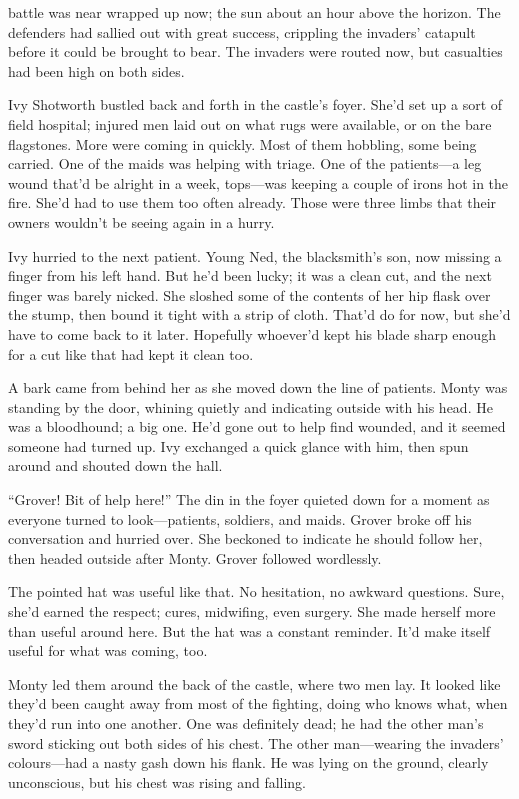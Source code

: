 \storychapter{}

 battle was near wrapped up now; the sun about an hour above the horizon.
The defenders had sallied out with great success, crippling the invaders' catapult before it could be brought to bear.
The invaders were routed now, but casualties had been high on both sides.

Ivy Shotworth bustled back and forth in the castle's foyer.
She'd set up a sort of field hospital; injured men laid out on what rugs were available, or on the bare flagstones.
More were coming in quickly.
Most of them hobbling, some being carried.
One of the maids was helping with triage.
One of the patients---a leg wound that'd be alright in a week, tops---was keeping a couple of irons hot in the fire.
She'd had to use them too often already.
Those were three limbs that their owners wouldn't be seeing again in a hurry.

Ivy hurried to the next patient.
Young Ned, the blacksmith's son, now missing a finger from his left hand.
But he'd been lucky; it was a clean cut, and the next finger was barely nicked.
She sloshed some of the contents of her hip flask over the stump, then bound it tight with a strip of cloth.
That'd do for now, but she'd have to come back to it later.
Hopefully whoever'd kept his blade sharp enough for a cut like that had kept it clean too.

A bark came from behind her as she moved down the line of patients.
Monty was standing by the door, whining quietly and indicating outside with his head.
He was a bloodhound; a big one.
He'd gone out to help find wounded, and it seemed someone had turned up.
Ivy exchanged a quick glance with him, then spun around and shouted down the hall.

``Grover!
Bit of help here!''
The din in the foyer quieted down for a moment as everyone turned to look---patients, soldiers, and maids.
Grover broke off his conversation and hurried over.
She beckoned to indicate he should follow her, then headed outside after Monty.
Grover followed wordlessly.

The pointed hat was useful like that.
No hesitation, no awkward questions.
Sure, she'd earned the respect; cures, midwifing, even surgery.
She made herself more than useful around here.
But the hat was a constant reminder.
It'd make itself useful for what was coming, too.

Monty led them around the back of the castle, where two men lay.
It looked like they'd been caught away from most of the fighting, doing who knows what, when they'd run into one another.
One was definitely dead; he had the other man's sword sticking out both sides of his chest.
The other man---wearing the invaders' colours---had a nasty gash down his flank.
He was lying on the ground, clearly unconscious, but his chest was rising and falling.

